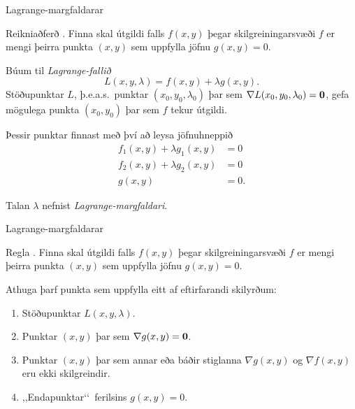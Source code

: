 \begin{frame}{Lagrange-margfaldarar} 

\begin {block}{Reikniaðferð \kaflanr.}
  Finna skal útgildi falls $f(x,y)$ þegar skilgreiningarsvæði $f$ er mengi þeirra punkta $(x,y)$ sem uppfylla jöfnu $g(x,y)=0$.  

\medskip
Búum til {\em Lagrange-fallið}
$$L(x,y,\lambda)=f(x,y)+\lambda g(x,y).$$
Stöðupunktar $L$, þ.e.a.s.~punktar $(x_0,y_0,\lambda_0)$ þar sem $\nabla L(x_0,y_0,\lambda_0)=\mbox{${\bf 0}$}$, gefa mögulega punkta $(x_0,y_0)$ þar sem $f$ tekur útgildi.

\medskip
Þessir punktar finnast með því að leysa jöfnuhneppið
\begin{align*}
f_1(x,y)+\lambda g_1(x,y)&=0\\
f_2(x,y)+\lambda g_2(x,y)&=0\\
g(x,y)&=0.
\end{align*}
\end{block}
Talan $\lambda$ nefnist \emph{Lagrange-margfaldari}.
\end{frame}


\begin{frame}{Lagrange-margfaldarar} 

\begin {block}{Regla \kaflanr.}
Finna skal útgildi falls $f(x,y)$ þegar skilgreiningarsvæði $f$ er mengi þeirra punkta $(x,y)$ sem uppfylla jöfnu $g(x,y)=0$.  

Athuga þarf punkta sem uppfylla eitt af eftirfarandi skilyrðum:

\begin {enumerate}
 \item Stöðupunktar $L(x,y,\lambda)$.
\item Punktar $(x,y)$ þar sem $\nabla g(x,y)=\mbox{${\bf 0}$}$.
\item  Punktar $(x,y)$ þar sem annar eða báðir stiglanna $\nabla
      g(x,y)$ og $\nabla f(x,y)$ eru ekki skilgreindir. 
\item ,,Endapunktar\lq\lq\ ferilsins $g(x,y)=0$.
 \end {enumerate}

\end{block}

\end{frame}


